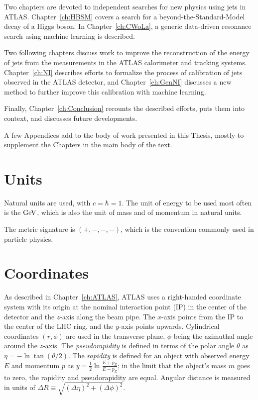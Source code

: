 Two chapters are devoted to independent searches for new physics using jets in ATLAS.
Chapter~\ref{ch:HBSM} covers a search for a beyond-the-Standard-Model decay of a Higgs boson.
In Chapter~\ref{ch:CWoLa}, a generic data-driven resonance search using machine learning is described.

Two following chapters discuss work to improve the reconstruction of the energy of jets from the measurements in the ATLAS calorimeter and tracking systems.
Chapter~\ref{ch:NI} describes efforts to formalize the process of calibration of jets observed in the ATLAS detector, and Chapter~\ref{ch:GenNI} discusses a new method to further improve this calibration with machine learning.

Finally, Chapter~\ref{ch:Conclusion} recounts the described efforts, puts them into context, and discusses future developments.

A few Appendices add to the body of work presented in this Thesis, mostly to supplement the Chapters in the main body of the text.

\section{Units}
Natural units are used, with $c=\hbar=1$.
The unit of energy to be used most often is the $\mathrm{GeV}$, which is also the unit of mass and of momentum in natural units.

The metric signature is $(+,-,-,-)$, which is the convention commonly used in particle physics.

\section{Coordinates}
As described in Chapter~\ref{ch:ATLAS}, ATLAS uses a right-handed coordinate system with its origin at the nominal interaction point (IP)
in the center of the detector and the \(z\)-axis along the beam pipe.
The \(x\)-axis points from the IP to the center of the LHC ring,
and the \(y\)-axis points upwards.
Cylindrical coordinates \((r,\phi)\) are used in the transverse plane,
\(\phi\) being the azimuthal angle around the \(z\)-axis.
The \textit{pseudorapidity} is defined in terms of the polar angle \(\theta\) as \(\eta = -\ln \tan(\theta/2)\).
The \textit{rapidity} is defined for an object with observed energy $E$ and momentum $p$ as \(y = \frac{1}{2}\ln\frac{E+p_Z}{E-p_Z}\); in the limit that the object's mass $m$ goes to zero, the rapidity and pseudorapidity are equal.
Angular distance is measured in units of \(\Delta R \equiv \sqrt{(\Delta\eta)^{2} + (\Delta\phi)^{2}}\).

